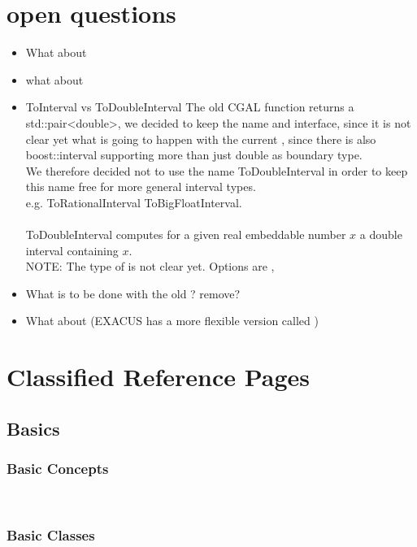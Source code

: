 \section{open questions}
\begin{itemize} 
\item What about 
\item what about 

\item ToInterval vs ToDoubleInterval The old CGAL function 
       returns a
      std::pair<double>, we decided to keep the name and interface, since it is not 
      clear yet what is going to happen with the current , 
      since there is also boost::interval supporting more than just double as 
      boundary type.\\
      We therefore decided not to use the name ToDoubleInterval in order to keep 
      this name free for more general interval types. \\
      e.g. ToRationalInterval ToBigFloatInterval. \\
      \\ 
      ToDoubleInterval computes for a given real embeddable number $x$ a double interval containing $x$. \\
      NOTE: The type of  is not clear yet. 
      Options are , 
\item What is to be done with the old  ? remove? 
\item What about  (EXACUS has a more flexible version called )

\end{itemize}

\section{Classified Reference Pages}

\subsection*{Basics}
\subsubsection*{Basic Concepts}
\\
\subsubsection*{Basic Classes}
\\
\\


